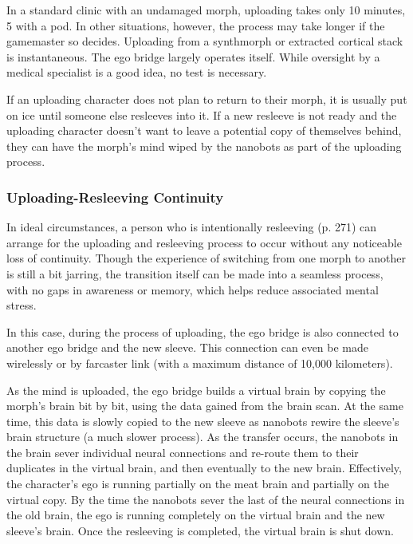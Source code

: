 In a standard clinic with an undamaged morph, uploading takes only 10 minutes, 5 with a pod. In other situations, however, the process may take longer if the gamemaster so decides. Uploading from a synthmorph or extracted cortical stack is instantaneous. The ego bridge largely operates itself. While oversight by a medical specialist is a good idea, no test is necessary. 

If an uploading character does not plan to return to their morph, it is usually put on ice until someone else resleeves into it. If a new resleeve is not ready and the uploading character doesn't want to leave a potential copy of themselves behind, they can have the morph's mind wiped by the nanobots as part of the uploading process. 

\subsubsection{Uploading-Resleeving Continuity} 

In ideal circumstances, a person who is intentionally resleeving (p. 271) can arrange for the uploading and resleeving process to occur without any noticeable loss of continuity. Though the experience of switching from one morph to another is still a bit jarring, the transition itself can be made into a seamless process, with no gaps in awareness or memory, which helps reduce associated mental stress. 

In this case, during the process of uploading, the ego bridge is also connected to another ego bridge and the new sleeve. This connection can even be made wirelessly or by farcaster link (with a maximum distance of 10,000 kilometers). 

As the mind is uploaded, the ego bridge builds a virtual brain by copying the morph's brain bit by bit, using the data gained from the brain scan. At the same time, this data is slowly copied to the new sleeve as nanobots rewire the sleeve's brain structure (a much slower process). As the transfer occurs, the nanobots in the brain sever individual neural connections and re-route them to their duplicates in the virtual brain, and then eventually to the new brain. Effectively, the character's ego is running partially on the meat brain and partially on the virtual copy. By the time the nanobots sever the last of the neural connections in the old brain, the ego is running completely on the virtual brain and the new sleeve's brain. Once the resleeving is completed, the virtual brain is shut down. 


